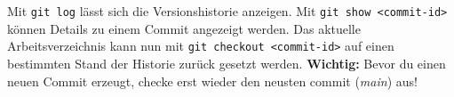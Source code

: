 Mit \lstinline|git log| lässt sich die Versionshistorie anzeigen. Mit \lstinline|git show <commit-id>| können Details zu einem Commit angezeigt werden. Das aktuelle Arbeitsverzeichnis kann nun mit \lstinline|git checkout <commit-id>| auf einen bestimmten Stand der Historie zurück gesetzt werden.
\textbf{Wichtig:} Bevor du einen neuen Commit erzeugt, checke erst wieder den neusten commit (\textit{main}) aus!
